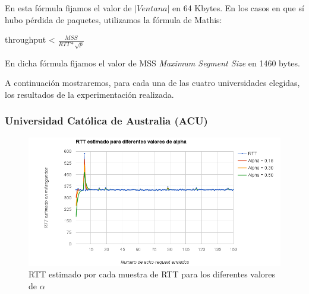 En esta fórmula fijamos el valor de $|Ventana|$ en 64 Kbytes.
En los casos en que sí hubo pérdida de paquetes, utilizamos la fórmula de Mathis:
\begin{center}
	throughput < $\frac{MSS}{RTT * \sqrt{p}}$
\end{center}

En dicha fórmula fijamos el valor de MSS \textit{Maximum Segment Size} en 1460 bytes.


A continuación mostraremos, para cada una de las cuatro universidades elegidas, los resultados de la experimentación realizada.

\subsubsection{Universidad Católica de Australia (ACU)}

\begin{figure}[H]
\begin{changemargin}{-5cm}{-5cm}
    \includegraphics[width=1.5\textwidth]{../Experimentacion/Australia/ertt.png}
    \caption{RTT estimado por cada muestra de RTT para los diferentes valores de $\alpha$}
  \label{ertt-aus}
  \end{changemargin}
\end{figure}


